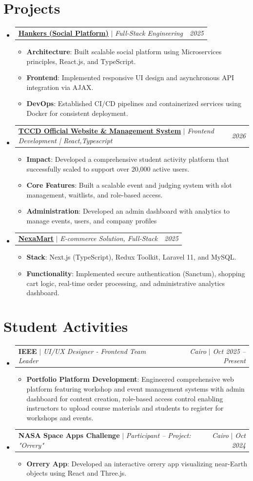 \documentclass[letterpaper,11pt]{article}
\makeatletter
\newcommand{\resumeItem}[2]{\item\small{\textbf{#1}{: #2 \vspace{-2pt}}}}
\newcommand{\resumeProjectSubheading}[3]{
  \vspace{-1pt}\item
    \begin{tabular*}{0.97\textwidth}{l@{\extracolsep{\fill}}r}
      \textbf{#1} $|$ \textit{\small#2} & #3 \\
    \end{tabular*}\vspace{-13pt}
}
\newcommand{\resumeActivitySubheading}[4]{
  \vspace{-1pt}\item
    \begin{tabular*}{0.97\textwidth}{l@{\extracolsep{\fill}}r}
      \textbf{#1} $|$ \textit{\small#3} & \textit{\small#2} $|$ \textit{\small #4} \\
    \end{tabular*}\vspace{-13pt}
}
\newcommand{\resumeSubHeadingListStart}{\begin{itemize}[leftmargin=*]}
\newcommand{\resumeSubHeadingListEnd}{\end{itemize}}
\newcommand{\resumeItemListStart}{\vspace*{0.3pt}\begin{itemize}[leftmargin=*,topsep=0pt,itemsep=1.2pt,parsep=0pt,partopsep=0pt]}
\newcommand{\resumeItemListEnd}{\end{itemize}\vspace{-3pt}}
\makeatother
\begin{document}
\section{Projects}
  \resumeSubHeadingListStart
    \resumeProjectSubheading
      {\href{https://github.com/SWEProject25}{\textbf{Hankers (Social Platform)}}}{Full-Stack Engineering}{\textit{\small 2025}}
      \resumeItemListStart
        \resumeItem{Architecture}
          {Built scalable social platform using Microservices principles, React.js, and TypeScript.}
        \resumeItem{Frontend}
          {Implemented responsive UI design and asynchronous API integration via AJAX.}
        \resumeItem{DevOps}
          {Established CI/CD pipelines and containerized services using Docker for consistent deployment.}
      \resumeItemListEnd
    \vspace{4pt}
    \resumeProjectSubheading
      {\href{https://tccd.eng.cu.edu.eg/}{\textbf{TCCD Official Website \& Management System}}}{Frontend Development | React,Typescript}{\textit{\small 2026}}
      \resumeItemListStart
        \resumeItem{Impact}
          {Developed a comprehensive student activity platform that successfully scaled to support over 20,000 active users.}
        \resumeItem{Core Features}
          {Built a scalable event and judging system with slot management, waitlists, and role-based access.}
        \resumeItem{Administration}
          {Developed an admin dashboard with analytics to manage events, users, and company profiles}
      \resumeItemListEnd
    \vspace{4pt}
    \resumeProjectSubheading
      {\href{https://github.com/ahmedfathy0-0/NexaMart.git}{\textbf{NexaMart}}}{E-commerce Solution, Full-Stack}{\textit{\small 2025}}
      \resumeItemListStart
        \resumeItem{Stack}
          {Next.js (TypeScript), Redux Toolkit, Laravel 11, and MySQL.}
        \resumeItem{Functionality}
          {Implemented secure authentication (Sanctum), shopping cart logic, real-time order processing, and administrative analytics dashboard.}
      \resumeItemListEnd
  \resumeSubHeadingListEnd
  \vspace{-2pt}
\section{Student Activities}
  \resumeSubHeadingListStart
    \resumeActivitySubheading
      {IEEE}{Cairo}{UI/UX Designer - Frontend Team Leader}{Oct 2025 -- Present}
      \resumeItemListStart
        \resumeItem{Portfolio Platform Development}
          {Engineered comprehensive web platform featuring workshop and event management systems with admin dashboard for content creation, role-based access control enabling instructors to upload course materials and students to register for workshops and events.}
      \resumeItemListEnd
    \vspace{4pt}
    \resumeActivitySubheading
      {NASA Space Apps Challenge}{Cairo}{Participant -- Project: "Orrery"}{Oct 2024}
      \resumeItemListStart
        \resumeItem{Orrery App}
          {Developed an interactive orrery app visualizing near-Earth objects using React and Three.js.}
      \resumeItemListEnd
  \resumeSubHeadingListEnd
  \vspace{-2pt}
\end{document}
